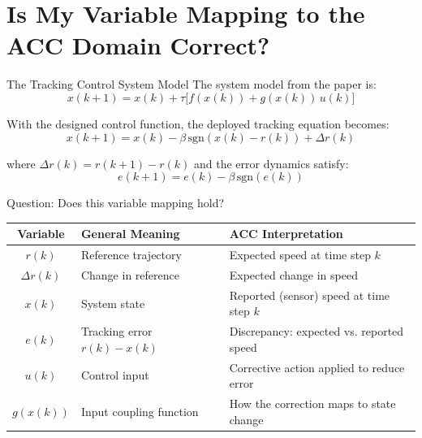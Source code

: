 \section{Is My Variable Mapping to the ACC Domain Correct?}

\begin{contextbox}{The Tracking Control System Model}
	The system model from the paper is:
	\begin{equation}
		x(k+1) = x(k) + \tau\bigl[f(x(k)) + g(x(k))\, u(k)\bigr]
		\tag{System Model}
	\end{equation}
	
	With the designed control function, the deployed tracking equation becomes:
	\begin{equation}
		x(k+1) = x(k) - \beta\,\text{sgn}(x(k) - r(k)) + \Delta r(k)
		\tag{Tracking Eq.}
	\end{equation}
	
	where $\Delta r(k) = r(k+1) - r(k)$ and the error dynamics satisfy:
	\begin{equation}
		e(k+1) = e(k) - \beta\,\text{sgn}(e(k))
		\tag{Error Dynamics}
	\end{equation}
\end{contextbox}

\begin{questionbox}{Question: Does this variable mapping hold?}
	\renewcommand{\arraystretch}{1.5}
	\begin{center}
		\begin{tabular}{|c|l|l|}
			\hline
			\textbf{Variable} & \textbf{General Meaning}     & \textbf{ACC Interpretation}               \\
			\hline
			$r(k)$            & Reference trajectory         & Expected speed at time step $k$           \\
			\hline
			$\Delta r(k)$     & Change in reference          & Expected change in speed                  \\
			\hline
			$x(k)$            & System state                 & Reported (sensor) speed at time step $k$  \\
			\hline
			$e(k)$            & Tracking error $r(k) - x(k)$ & Discrepancy: expected vs. reported speed  \\
			\hline
			$u(k)$            & Control input                & Corrective action applied to reduce error \\
			\hline
			$g(x(k))$         & Input coupling function      & How the correction maps to state change   \\
			\hline
		\end{tabular}
	\end{center}
\end{questionbox}

